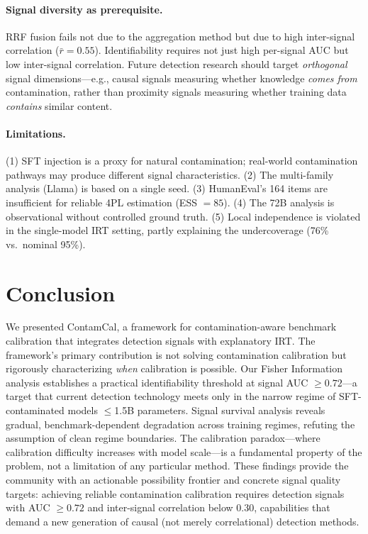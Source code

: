 \documentclass[letterpaper,11pt]{article}
\begin{document}
\paragraph{Signal diversity as prerequisite.}
RRF fusion fails not due to the aggregation method but due to high inter-signal correlation ($\bar{r} = 0.55$).
Identifiability requires not just high per-signal AUC but low inter-signal correlation.
Future detection research should target \emph{orthogonal} signal dimensions---e.g., causal signals measuring whether knowledge \emph{comes from} contamination, rather than proximity signals measuring whether training data \emph{contains} similar content.

\paragraph{Limitations.}
(1) SFT injection is a proxy for natural contamination; real-world contamination pathways may produce different signal characteristics.
(2) The multi-family analysis (Llama) is based on a single seed.
(3) HumanEval's 164 items are insufficient for reliable 4PL estimation (ESS $= 85$).
(4) The 72B analysis is observational without controlled ground truth.
(5) Local independence is violated in the single-model IRT setting, partly explaining the undercoverage (76\% vs.\ nominal 95\%).

\section{Conclusion}

We presented ContamCal, a framework for contamination-aware benchmark calibration that integrates detection signals with explanatory IRT.
The framework's primary contribution is not solving contamination calibration but rigorously characterizing \emph{when} calibration is possible.
Our Fisher Information analysis establishes a practical identifiability threshold at signal AUC $\geq 0.72$---a target that current detection technology meets only in the narrow regime of SFT-contaminated models $\leq$1.5B parameters.
Signal survival analysis reveals gradual, benchmark-dependent degradation across training regimes, refuting the assumption of clean regime boundaries.
The calibration paradox---where calibration difficulty increases with model scale---is a fundamental property of the problem, not a limitation of any particular method.
These findings provide the community with an actionable possibility frontier and concrete signal quality targets: achieving reliable contamination calibration requires detection signals with AUC $\geq 0.72$ and inter-signal correlation below 0.30, capabilities that demand a new generation of causal (not merely correlational) detection methods.
\end{document}
